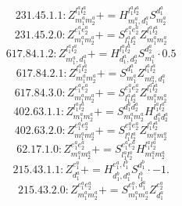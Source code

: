 \documentclass[letterpaper,10pt,fleqn,leqno,onecolumn]{article}
\begin{document}
\begin{equation} \;\;\;\;\;\;  231.45.1.1: Z^{l_{1}^{a}l_{2}^{a}}_{m_{1}^{a}m_{2}^{a}}+=H^{l_{1}^{a}l_{2}^{a}}_{m_{1}^{a},d_{1}^{a}}S^{d_{1}^{a}}_{m_{2}^{a}} \end{equation}
\begin{equation} \;\;\;\;\;\;  231.45.2.0: Z^{e_{1}^{a}e_{2}^{a}}_{m_{1}^{a}m_{2}^{a}}+=S^{e_{1}^{a}e_{2}^{a}}_{l_{1}^{a}l_{2}^{a}}Z^{l_{1}^{a}l_{2}^{a}}_{m_{1}^{a}m_{2}^{a}} \end{equation}
\begin{equation} \;\;\;\;\;\;  617.84.1.2: Z^{l_{1}^{a}l_{2}^{a}}_{m_{1}^{a},d_{1}^{a}}+=H^{l_{1}^{a}l_{2}^{a}}_{d_{1}^{a},d_{2}^{a}}S^{d_{2}^{a}}_{m_{1}^{a}}\cdot 0.5 \end{equation}
\begin{equation} \;\;\;\;\;\;  617.84.2.1: Z^{l_{1}^{a}l_{2}^{a}}_{m_{1}^{a}m_{2}^{a}}+=S^{d_{1}^{a}}_{m_{1}^{a}}Z^{l_{1}^{a}l_{2}^{a}}_{m_{2}^{a},d_{1}^{a}} \end{equation}
\begin{equation} \;\;\;\;\;\;  617.84.3.0: Z^{e_{1}^{a}e_{2}^{a}}_{m_{1}^{a}m_{2}^{a}}+=S^{e_{1}^{a}e_{2}^{a}}_{l_{1}^{a}l_{2}^{a}}Z^{l_{1}^{a}l_{2}^{a}}_{m_{1}^{a}m_{2}^{a}} \end{equation}
\begin{equation} \;\;\;\;\;\;  402.63.1.1: Z^{l_{1}^{a}l_{2}^{a}}_{m_{1}^{a}m_{2}^{a}}+=S^{d_{1}^{a}d_{2}^{a}}_{m_{1}^{a}m_{2}^{a}}H^{l_{1}^{a}l_{2}^{a}}_{d_{1}^{a}d_{2}^{a}} \end{equation}
\begin{equation} \;\;\;\;\;\;  402.63.2.0: Z^{e_{1}^{a}e_{2}^{a}}_{m_{1}^{a}m_{2}^{a}}+=S^{e_{1}^{a}e_{2}^{a}}_{l_{1}^{a}l_{2}^{a}}Z^{l_{1}^{a}l_{2}^{a}}_{m_{1}^{a}m_{2}^{a}} \end{equation}
\begin{equation} \;\;\;\;\;\;  62.17.1.0: Z^{e_{1}^{a}e_{2}^{a}}_{m_{1}^{a}m_{2}^{a}}+=S^{e_{1}^{a}e_{2}^{a}}_{l_{1}^{a}l_{2}^{a}}H^{l_{1}^{a}l_{2}^{a}}_{m_{1}^{a}m_{2}^{a}} \end{equation}
\begin{equation} \;\;\;\;\;\;  215.43.1.1: Z^{e_{1}^{a}}_{d_{1}^{a}}+=H^{e_{1}^{a},l_{1}^{b}}_{d_{1}^{b},d_{1}^{a}}S^{d_{1}^{b}}_{l_{1}^{b}}\cdot -1. \end{equation}
\begin{equation} \;\;\;\;\;\;  215.43.2.0: Z^{e_{1}^{a}e_{2}^{a}}_{m_{1}^{a}m_{2}^{a}}+=S^{e_{1}^{a},d_{1}^{a}}_{m_{1}^{a}m_{2}^{a}}Z^{e_{2}^{a}}_{d_{1}^{a}} \end{equation}
\end{document}
